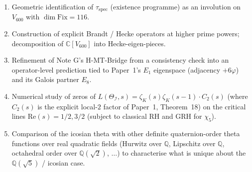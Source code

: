 \documentclass[11pt,a4paper]{article}
\theoremstyle{definition}
\theoremstyle{remark}
\newcommand{\Q}{\mathbb{Q}}
\newcommand{\C}{\mathbb{C}}
\newcommand{\II}{\mathcal{I}}
\begin{document}
\begin{enumerate}
  \item Geometric identification of $\tau_\mathrm{spec}$ (existence
    programme) as an involution on $V_{600}$ with $\dim \mathrm{Fix} = 116$.

  \item Construction of explicit Brandt / Hecke operators at higher prime
    powers; decomposition of $\C[V_{600}]$ into Hecke-eigen-pieces.

  \item Refinement of Note G's H-MT-Bridge from a consistency check
    into an operator-level prediction tied to Paper~1's $E_1$
    eigenspace (adjacency $+6\varphi$) and its Galois partner $E_8$.

  \item Numerical study of zeros of $L(\Theta_\II, s) = \zeta_K(s) \zeta_K(s-1) \cdot C_2(s)$ (where $C_2(s)$ is the explicit local-$2$ factor of Paper~1, Theorem~18)
    on the critical lines $\mathrm{Re}(s) = 1/2, 3/2$ (subject to classical
    RH and GRH for $\chi_5$).

  \item Comparison of the icosian theta with other definite quaternion-order
    theta functions over real quadratic fields (Hurwitz over $\Q$, Lipschitz
    over $\Q$, octahedral order over $\Q(\sqrt 2)$, $\dots$) to characterise
    what is unique about the $\Q(\sqrt 5)$ / icosian case.
\end{enumerate}

\bigskip
\end{document}
